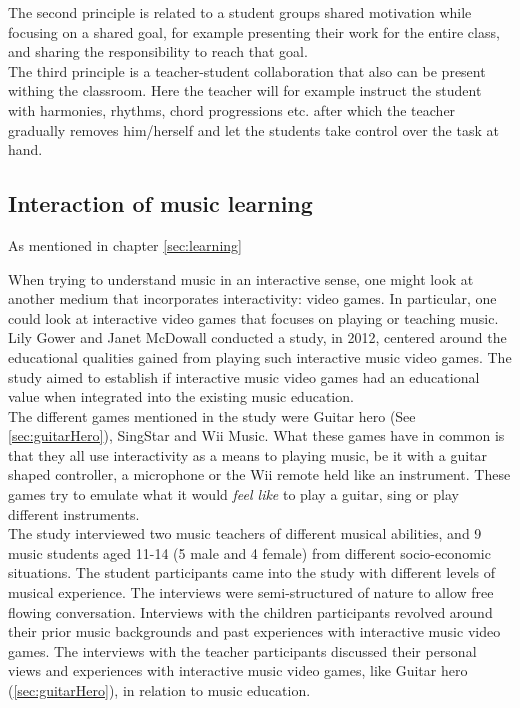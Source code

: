 	The second principle is related to a student groups shared motivation while focusing on a shared goal, for example presenting their work for the entire class, and sharing the responsibility to reach that goal.\\
	
	The third principle is a teacher-student collaboration that also can be present withing the classroom. Here the teacher will for example instruct the student with harmonies, rhythms, chord progressions etc. after which the teacher gradually removes him/herself and let the students take control over the task at hand.\\
	

	\subsection{Interaction of music learning}		
	As mentioned in chapter \ref{sec:learning}
	
When trying to understand music in an interactive sense, one might look at another medium that incorporates interactivity: video games. In particular, one could look at interactive video games that focuses on playing or teaching music. Lily Gower and Janet McDowall conducted a study, in 2012, centered around the educational qualities gained from playing such interactive music video games\cite{interactiveMusicVideoGames}. The study aimed to establish if interactive music video games had an educational value when integrated into the existing music education.\\

The different games mentioned in the study were Guitar hero (See \autoref{sec:guitarHero}), SingStar and Wii Music. What these games have in common is that they all use interactivity as a means to playing music, be it with a guitar shaped controller, a microphone or the Wii remote held like an instrument. These games try to emulate what it would \textit{feel like} to play a guitar, sing or play different instruments.\\

The study interviewed two music teachers of different musical abilities, and 9 music students aged 11-14 (5 male and 4 female) from different socio-economic situations. The student participants came into the study with different levels of musical experience. The interviews were semi-structured of nature to allow free flowing conversation. Interviews with the children participants revolved around their prior music backgrounds and past experiences with interactive music video games. The interviews with the teacher participants discussed their personal views and experiences with interactive music video games, like Guitar hero (\autoref{sec:guitarHero}), in relation to music education.\\

